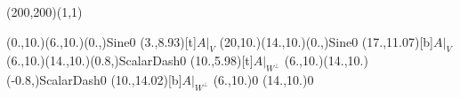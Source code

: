 \unitlength=1bp%

\begin{feynartspicture}(200,200)(1,1)

\FADiagram{}
\FAProp(0.,10.)(6.,10.)(0.,){Sine}{0}
\FALabel(3.,8.93)[t]{$A|_V$}
\FAProp(20,10.)(14.,10.)(0.,){Sine}{0}
\FALabel(17.,11.07)[b]{$A|_V$}
\FAProp(6.,10.)(14.,10.)(0.8,){ScalarDash}{0}
\FALabel(10.,5.98)[t]{$A|_{W^\perp}$}
\FAProp(6.,10.)(14.,10.)(-0.8,){ScalarDash}{0}
\FALabel(10.,14.02)[b]{$A|_{W^\perp}$}
\FAVert(6.,10.){0}
\FAVert(14.,10.){0}
\end{feynartspicture}

